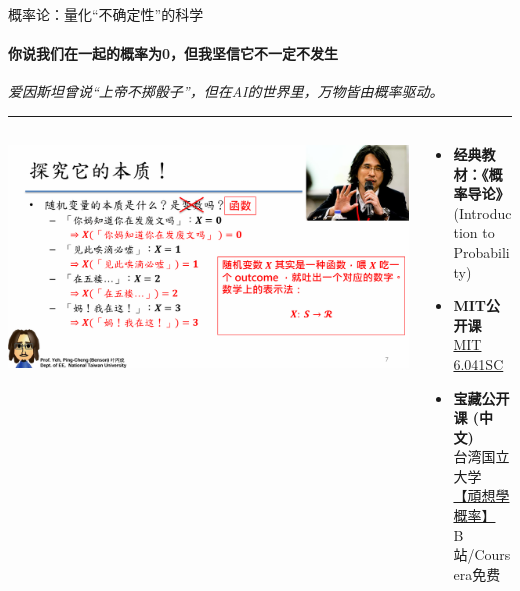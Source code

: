 \documentclass{beamer}
\newcommand{\hrefcol}[2]{\textcolor{cyan}{\href{#1}{#2}}}
\begin{document}
\begin{frame}{概率论：量化“不确定性”的科学}
\framesubtitle{你说我们在一起的概率为0，但我坚信它不一定不发生}
    \begin{center}
        \large\textit{爱因斯坦曾说“上帝不掷骰子”，但在AI的世界里，\alert{万物皆由概率驱动}。}
    \end{center}
    
    \rule{\textwidth}{0.4pt}
    \vspace{0.3cm}
    
    \begin{columns}[T]
         \begin{column}{0.5\textwidth}
         \includegraphics[width=\textwidth]{assets/prob.png}
         \end{column}
        \begin{column}{0.5\textwidth}
            \begin{itemize}
                \item \textbf{经典教材：《概率导论》} \\
                \small (Introduction to Probability) 
                
                \item \textbf{MIT公开课} \\
                \small \hrefcol{https://ocw.mit.edu/courses/6-041sc-probabilistic-systems-analysis-and-applied-probability-fall-2013/}{MIT 6.041SC}
                
                \item \textbf{宝藏公开课 (中文)} \\
                \small 台湾国立大学 \hrefcol{https://www.coursera.org/learn/prob1/}{【頑想學概率】} \\
                \small B站/Coursera免费
            \end{itemize}
        \end{column}
    \end{columns}
\end{frame}
\end{document}
